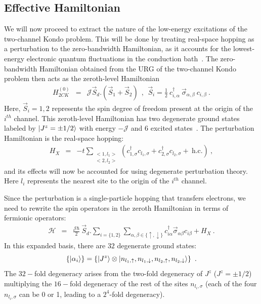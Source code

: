 \documentclass[reprint,prb,superscriptaddress]{revtex4-2}
\begin{document}
\subsection{Effective Hamiltonian}
\label{sec:eff_ham_2ch}

We will now proceed to extract the nature of the low-energy excitations of the two-channel Kondo problem. This will be done by treating real-space hopping as a perturbation to the zero-bandwidth Hamiltonian, as it accounts for the lowest-energy electronic quantum fluctuations in the conduction bath~\cite{nozieres1974fermi}. The zero-bandwidth Hamiltonian obtained from the URG of the two-channel Kondo problem then acts as the zeroth-level Hamiltonian
\begin{eqnarray}
H^{(0)}_{2CK}&=& {\mathcal{J}} \vec{S}_d.(\vec{S}_1+\vec{S}_2)~~,~~\vec{S}_i =  \frac{1}{2}~ c_{i,\alpha}^{\dagger}~ \vec{\sigma}_{\alpha,\beta}~ c_{i,\beta}~.
\label{eq:channel-2-spin}
\end{eqnarray}
Here, $\vec{S}_i=1,2$ represents the spin degree of freedom present at the origin of the $i^{th}$ channel. This zeroth-level Hamiltonian has two degenerate ground states labeled by $\ket{J^z=\pm 1/2}$ with energy $-\mathcal{J}$ and $6$ excited states~\cite{kunj_slal_1999}.
The perturbation Hamiltonian is the real-space hopping:
\begin{eqnarray}
H_{X} &=& -t \displaystyle\sum_{\substack{<1,l_1> \\ <2,l_2>}} (c^{\dagger}_{1,\sigma}c_{l_1,\sigma}+c^{\dagger}_{2,\sigma}c_{l_2,\sigma}+ ~\textrm{h.c.})~,
\end{eqnarray}
and its effects will now be accounted for using degenerate perturbation theory. Here $l_i$ represents the nearest site to the origin of the $i^{th}$ channel.

Since the perturbation is a single-particle hopping that transfers electrons, we need to rewrite the spin operators in the zeroth Hamiltonian in terms of fermionic operators:
\begin{eqnarray}
\mathcal{H} &=& \frac{{\mathcal{J}}\hbar}{2}~ \vec{S}_d. \displaystyle\sum_{i=\{1,2\}} \displaystyle\sum_{\alpha,\beta\in\{\uparrow,\downarrow\}}c_{i\alpha}^{\dagger} \vec{\sigma}_{\alpha\beta} c_{i\beta} + H_X~.
\label{eq:excitation_hamiltonian}
\end{eqnarray}
In this expanded basis, there are $32$ degenerate ground states:
\begin{equation}
\label{gstate-set}
\left\{ \ket{\alpha_i} \right\} = \left\{ \ket{J^z}\otimes\ket{n_{l_1,\uparrow},n_{l_1,\downarrow},n_{l_2,\uparrow},n_{l_2,\downarrow}} \right\}~.
\end{equation}
The \(32-\)fold degeneracy arises from the two-fold degeneracy of \(J^z\) (\(J^z = \pm 1/2\)) multiplying the \(16-\)fold degeneracy of the rest of the sites \(n_{l_i,\sigma}\) (each of the four \(n_{l_i,\sigma}\) can be 0 or 1, leading to a \(2^4\)-fold degeneracy).
\end{document}
